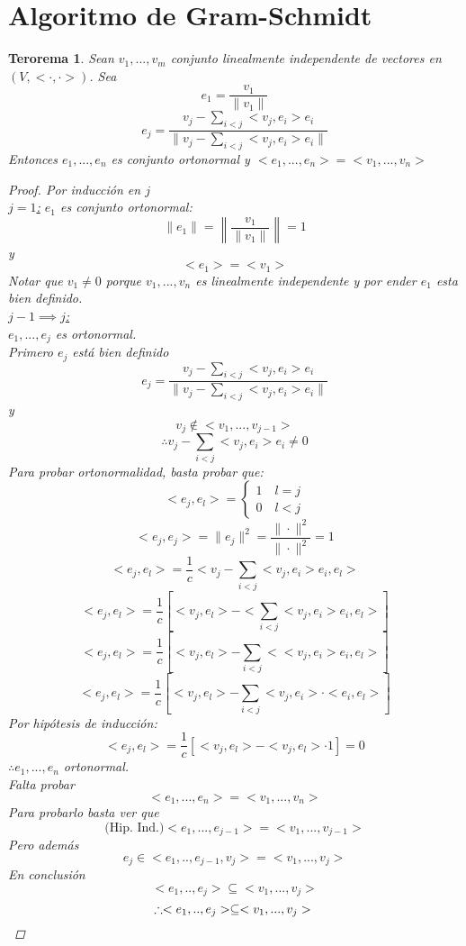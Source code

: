 \documentclass[11pt]{book}
\newtheorem{thm}{Terorema}[section]
\theoremstyle{definition}
\begin{document}
\section{Algoritmo de Gram-Schmidt}
\begin{thm}
	Sean $v_1,...,v_m$ conjunto linealmente independente de vectores en $(V,<\cdot,\cdot>)$. Sea
	\[e_1=\frac{v_1}{\|v_1\|}\]
	\[e_j=\frac{v_j-\sum_{i<j}<v_j,e_i>e_i}{\|v_j-\sum_{i<j}<v_j,e_i>e_i\|}\]
	Entonces $e_1,...,e_n$ es conjunto ortonormal y $<e_1,...,e_n>=<v_1,...,v_n>$
	\begin{proof}
		Por inducción en $j$\\
		\underline{$j=1$:} $e_1$ es conjunto ortonormal:
		\[\|e_1\|=\left\|\frac{v_1}{\|v_1\|}\right\|=1\]
		y
		\[<e_1>=<v_1>\]
		Notar que $v_1\neq 0$ porque $v_1,...,v_n$ es linealmente independente y por ender $e_1$ esta bien definido.\\
		\underline{$j-1\implies j$:}\\
		$e_1,...,e_j$ es ortonormal.\\
		Primero $e_j$ está bien definido
		\[e_j=\frac{v_j-\sum_{i<j}<v_j,e_i>e_i}{\|v_j-\sum_{i<j}<v_j,e_i>e_i\|}\]
		y
		\[v_j\notin <v_1,...,v_{j-1}>\]
		\[\therefore v_j-\sum_{i<j}<v_j,e_i>e_i\neq 0\]
		Para probar ortonormalidad, basta probar que:
		\[<e_j,e_l>=\begin{cases}
			1\quad l=j\\
			0\quad l<j
		\end{cases}\]
		\[<e_j,e_j>=\|e_j\|^2=\frac{\|\cdot\|^2}{\|\cdot\|^2}=1\]
		\[<e_j,e_l>=\frac{1}{c}<v_j-\sum_{i<j}<v_j,e_i>e_i,e_l>\]
		\[<e_j,e_l>=\frac{1}{c}\left[<v_j,e_l>-<\sum_{i<j}<v_j,e_i>e_i,e_l>\right]\]
		\[<e_j,e_l>=\frac{1}{c}\left[<v_j,e_l>-\sum_{i<j}<<v_j,e_i>e_i,e_l>\right]\]
		\[<e_j,e_l>=\frac{1}{c}\left[<v_j,e_l>-\sum_{i<j}<v_j,e_i>\cdot<e_i,e_l>\right]\]
		Por hipótesis de inducción:
		\[<e_j,e_l>=\frac{1}{c}\left[<v_j,e_l>-<v_j,e_l>\cdot 1\right]=0\]
		$\therefore e_1,...,e_n$ ortonormal.\\
		Falta probar
		\[<e_1,...,e_n>=<v_1,...,v_n>\]
		Para probarlo basta ver que\\
		\[\textrm{(Hip. Ind.)} <e_1,...,e_{j-1}>=<v_1,...,v_{j-1}>\]
		Pero además
		\[e_j\in<e_1,..,e_{j-1},v_j>=<v_1,...,v_j>\]
		En conclusión
		\[<e_1,..,e_j>\subseteq<v_1,...,v_j>\]
		\[\therefore<e_1,..,e_j>\subseteq<v_1,...,v_j>\qedhere\]
	\end{proof}
\end{thm}
\end{document}
